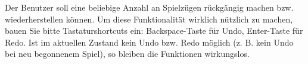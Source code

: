 Der Benutzer soll eine beliebige Anzahl an Spielz\"ugen r\"uckg\"angig
machen bzw. wiederherstellen k\"onnen. Um diese Funktionalit\"at
wirklich n\"utzlich zu machen, bauen Sie bitte Tastaturshortcuts ein:
Backspace-Taste f\"ur Undo, Enter-Taste f\"ur Redo. \undoExtraComment
Ist im aktuellen Zustand kein Undo bzw. Redo m\"oglich (z. B. kein Undo
bei neu begonnenem Spiel), so bleiben die Funktionen wirkungslos.
